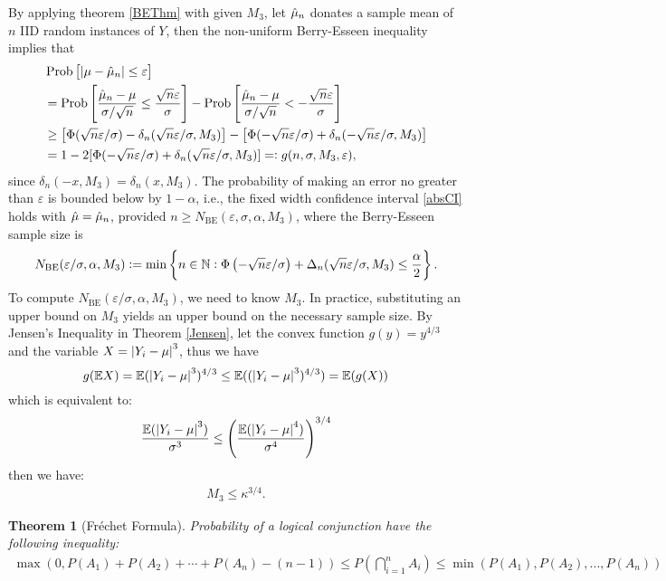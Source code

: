 \documentclass{iitthesis}
\newtheorem{theorem}{Theorem}[section]
\begin{document}
By applying theorem \ref{BEThm} with given $M_3$, let $\hat{\mu}_n$ donates a sample mean of $n$ IID random instances of $Y$, then the non-uniform Berry-Esseen inequality implies that
\begin{align} 
&\operatorname{Prob}\left[\left \lvert \mu-\hat{\mu}_n \right \rvert  \le \varepsilon \right]\nonumber\\
&=\operatorname{Prob}\left[\frac{\hat{\mu}_n - \mu}{\sigma/\sqrt{n}} \le \frac{\sqrt{n}\varepsilon}{\sigma} \right]-\operatorname{Prob}\left[\frac{\hat{\mu}_n - \mu}{\sigma/\sqrt{n}} < -\frac{\sqrt{n}\varepsilon}{\sigma}\right] \nonumber \\ 
&\ge \left[\Phi(\sqrt{n}\varepsilon/\sigma)-\delta_n(\sqrt{n}\varepsilon/\sigma,M_3)\right] -\left[\Phi(-\sqrt{n}\varepsilon/\sigma) + \delta_n(-\sqrt{n}\varepsilon/\sigma,M_3)\right] \nonumber \\
&=1-2[\Phi(-\sqrt{n}\varepsilon/\sigma) + \delta_n(\sqrt{n}\varepsilon/\sigma,M_3)] =: g(n, \sigma, M_3, \varepsilon), \label{BEresult}
\end{align}
since $\delta_n(-x,M_3)=\delta_n(x,M_3)$.  The probability of
making an error no greater than $\varepsilon$ is bounded below by $1-\alpha$, i.e., the fixed width confidence interval \eqref{absCI} holds with $\hat{\mu}=\hat{\mu}_n$, provided $n \ge N_{\text{BE}}(\varepsilon,\sigma,\alpha,M_3)$, where the Berry-Esseen sample size is
\begin{equation}\label{BEn}
N_{\text{BE}}(\varepsilon/\sigma,\alpha,M_3) := \min  \left \{ n \in \mathbb{N} : \Phi\left(-\sqrt{n}\varepsilon/\sigma  \right)+\Delta_n(\sqrt{n}\varepsilon/\sigma,M_3)
\le \frac{\alpha}{2} \right \}.
\end{equation}
To compute $N_{\text{BE}}(\varepsilon/\sigma,\alpha,M_3)$, we need to know
$M_3$. In practice, substituting an upper bound on $M_3$ yields an upper bound on the necessary sample size.
By Jensen's Inequality in Theorem \ref{Jensen}, let the convex function $g(y) = y^{4/3}$ and the variable $X = \left \lvert Y_i-\mu \right \rvert^3$, thus we have
$$g(\mathbb{E} X) = \mathbb{E}(\left \lvert Y_i-\mu \right \rvert^3)^{4/3} \leq \mathbb{E}((\left \lvert Y_i-\mu \right \rvert^3)^{4/3}) = \mathbb{E}(g(X))$$
which is equivalent to:
$$\frac{\mathbb{E}(\left \lvert Y_i-\mu \right \rvert^3)}{\sigma^3} \leq \left (\frac{\mathbb{E}(\left \lvert Y_i-\mu \right \rvert^4)}{\sigma^4}\right)^{3/4} $$
then we have:
\begin{align}\label{M3kappa}
M_3\leq \kappa^{3/4}.
\end{align}

\begin{theorem}[Fr\'{e}chet Formula] \cite{FrechetIneq}
Probability of a logical conjunction have the following inequality:
\begin{align}
\max(0, P(A_1) + P(A_2)+\cdots +P(A_n)-(n -1)) \leq P\left(\bigcap_{i=1}^n A_i\right)\leq \min(P(A_1), P(A_2), ..., P(A_n))
\end{align}
\end{theorem}
\end{document}
